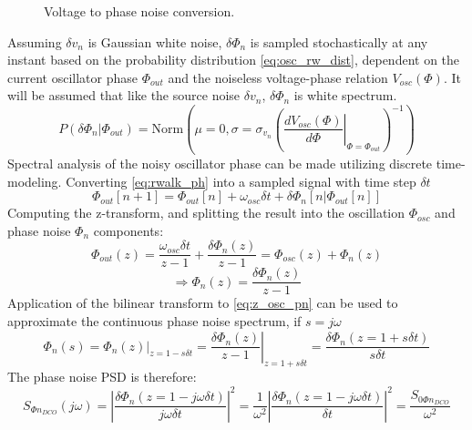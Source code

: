 		\begin{figure}[htb!]
			\center
			\caption{Voltage to phase noise conversion.}
			\label{fig:aperture_noise}
		\end{figure}
		\FloatBarrier
		  Assuming $\delta v_n$ is Gaussian white noise, $\delta\Phi_{n}$ is sampled stochastically at any instant based on the probability distribution \ref{eq:osc_rw_dist}, dependent on the current oscillator phase $\Phi_{out}$ and the noiseless voltage-phase relation $V_{osc}(\Phi)$. It will be assumed that like the source noise $\delta v_n$, $\delta\Phi_{n}$ is white spectrum.
		 \begin{equation}
		 	P(\delta\Phi_{n}|\Phi_{out}) = \text{Norm}\left(\mu=0, \sigma=\sigma_{v_n}\left(\left.\frac{dV_{osc}(\Phi)}{d\Phi}\right\vert_{\Phi=\Phi_{out}}\right)^{-1}\right) \label{eq:osc_rw_dist}
		 \end{equation} 
		Spectral analysis of the noisy oscillator phase can be made utilizing discrete time-modeling. Converting \ref{eq:rwalk_ph} into a sampled signal with time step $\delta t$ 
		\begin{equation}
			\Phi_{out}[n+1] = \Phi_{out}[n] + \omega_{osc}\delta t + \delta\Phi_n[n|\Phi_{out}[n]]
		\end{equation}
		Computing the z-transform, and splitting the result into the oscillation $\Phi_{osc}$ and phase noise $\Phi_{n}$ components:
		\begin{equation}
			\Phi_{out}(z) = \frac{\omega_{osc}\delta t}{z-1} + \frac{\delta\Phi_n(z)}{z-1} = \Phi_{osc}(z) + \Phi_{n}(z)
		\end{equation}
		\begin{equation}
			\Rightarrow \Phi_{n}(z) = \frac{\delta\Phi_n(z)}{z-1} \label{eq:z_osc_pn}
		\end{equation}
		Application of the bilinear transform to \ref{eq:z_osc_pn} can be used to approximate the continuous phase noise spectrum, if $s=j\omega$
		\begin{equation}
			\Phi_{n}(s) = \left.\Phi_{n}(z)\right\vert_{z=1-s\delta t} = \left.\frac{\delta\Phi_n(z)}{z-1}\right\vert_{z=1+s\delta t} = \frac{\delta\Phi_n(z=1+s\delta t)}{s\delta t}
		\end{equation}
		The phase noise PSD is therefore:
		\begin{equation}
			S_{\Phi n_{DCO}}(j\omega)= \left|\frac{\delta\Phi_n(z=1-j\omega \delta t)}{j\omega \delta t}\right|^2 = \frac{1}{\omega^2}\left|\frac{\delta\Phi_n(z=1-j\omega \delta t)}{\delta t}\right|^2 =  \frac{S_{0\Phi n_{DCO}}}{\omega^2}
		\end{equation}
